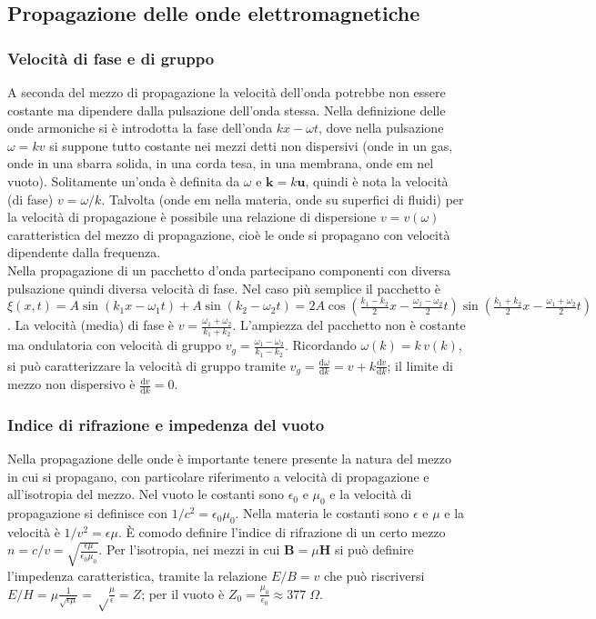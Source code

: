 \documentclass[11pt,a4paper]{article}
\newcommand{\de}{\mathrm d}
\newcommand{\fracd}[2]{\frac{\de #1}{\de #2}}
\begin{document}
\subsection{Propagazione delle onde elettromagnetiche}
\subsubsection{Velocità di fase e di gruppo}
A seconda del mezzo di propagazione la velocità dell'onda potrebbe non essere costante ma dipendere dalla pulsazione dell'onda stessa. Nella definizione delle onde armoniche si è introdotta la fase dell'onda $kx - \omega t$, dove nella pulsazione $\omega = k v$ si suppone tutto costante nei mezzi detti non dispersivi (onde in un gas, onde in una sbarra solida, in una corda tesa, in una membrana, onde em nel vuoto). Solitamente un'onda è definita da $\omega$ e $\textbf{k} = k \textbf{u}$, quindi è nota la velocità (di fase) $v = \omega/k$. Talvolta (onde em nella materia, onde su superfici di fluidi) per la velocità di propagazione è possibile una relazione di dispersione $v = v(\omega)$ caratteristica del mezzo di propagazione, cioè le onde si propagano con velocità dipendente dalla frequenza.\\
Nella propagazione di un pacchetto d'onda partecipano componenti con diversa pulsazione quindi diversa velocità di fase. Nel caso più semplice il pacchetto è $\xi(x,t) = A \sin(k_1 x - \omega_1 t) + A \sin(k_2 - \omega_2 t) = 2A \cos(\frac{k_1-k_2}2 x - \frac{\omega_1-\omega_2}2 t) \sin(\frac{k_1+k_2}2 x - \frac{\omega_1+\omega_2}2 t)$. La velocità (media) di fase è $v = \frac{\omega_1 + \omega_2}{k_1 + k_2}$. L'ampiezza del pacchetto non è costante ma ondulatoria con velocità di gruppo $v_g = \frac{\omega_1 - \omega_2}{k_1 - k_2}$. Ricordando $\omega(k) = k\, v(k)$, si può caratterizzare la velocità di gruppo tramite $v_g = \fracd{\omega}k = v + k \fracd{v}k$; il limite di mezzo non dispersivo è $\fracd{v}k = 0$.

\subsubsection{Indice di rifrazione e impedenza del vuoto}
Nella propagazione delle onde è importante tenere presente la natura del mezzo in cui si propagano, con particolare riferimento a velocità di propagazione e all'isotropia del mezzo. Nel vuoto le costanti sono $\epsilon_0$ e $\mu_0$ e la velocità di propagazione si definisce con $1/c^2 = \epsilon_0 \mu_0$. Nella materia le costanti sono $\epsilon$ e $\mu$ e la velocità è $1/v^2 = \epsilon \mu$. È comodo definire l'indice di rifrazione di un certo mezzo $n = c/v = \sqrt{\frac{\epsilon \mu}{\epsilon_0 \mu_0}}$. Per l'isotropia, nei mezzi in cui $\mathbf B = \mu\mathbf H$ si può definire l'impedenza caratteristica, tramite la relazione $E/B = v$ che può riscriversi $E/H = \mu \frac1{\sqrt{\epsilon\mu}} = \sqrt \frac\mu\epsilon = Z$; per il vuoto è $Z_0 = \frac{\mu_0}{\epsilon_0} \approx 377 \;\Omega$.
\end{document}
